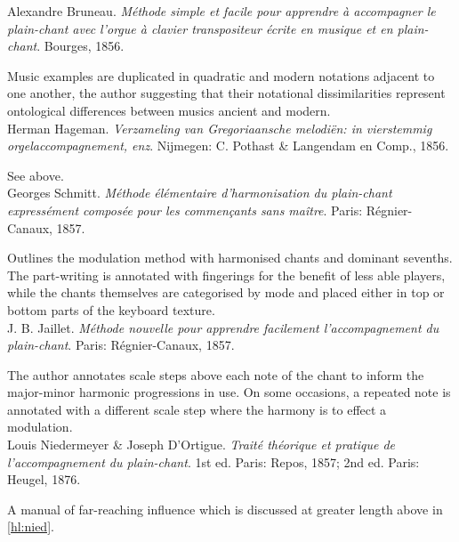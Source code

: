     \parindent=0pt
    \hangindent=0pt
  Alexandre Bruneau. \emph{Méthode simple et facile pour apprendre à accompagner le plain-chant  avec l'orgue à clavier transpositeur écrite en musique et en plain-chant}. Bourges, 1856.

     \parindent=20pt
     \hangindent=20pt
     Music examples are duplicated in quadratic and modern notations adjacent to one another, the author suggesting that their notational dissimilarities represent ontological differences between musics ancient and modern.\\

    \parindent=0pt
    \hangindent=0pt
  Herman Hageman. \emph{Verzameling van Gregoriaansche melodiën: in vierstemmig orgelaccompagnement, enz}. Nijmegen:  C. Pothast \& Langendam en Comp., 1856.

     \parindent=20pt
     \hangindent=20pt
     See  above.\\

    \parindent=0pt
    \hangindent=0pt
  Georges Schmitt. \emph{Méthode élémentaire d'harmonisation du plain-chant expressément composée pour les commençants sans maître}. Paris:  Régnier-Canaux, 1857.

     \parindent=20pt
     \hangindent=20pt
     Outlines the modulation method with harmonised chants and dominant sevenths. The part-writing is annotated with fingerings for the benefit of less able players, while the chants themselves are categorised by mode and placed either in top or bottom parts of the keyboard texture.\\

    \parindent=0pt
    \hangindent=0pt
  J. B. Jaillet. \emph{Méthode nouvelle pour apprendre facilement l'accompagnement du plain-chant}. Paris:  Régnier-Canaux, 1857.

     \parindent=20pt
     \hangindent=20pt
     The author annotates scale steps above each note of the chant to inform the major-minor harmonic progressions in use. On some occasions, a repeated note is annotated with a different scale step where the harmony is to effect a modulation.\\

    \parindent=0pt
    \hangindent=0pt
  Louis Niedermeyer \& Joseph D'Ortigue. \emph{Traité théorique et pratique de l'accompagnement du plain-chant}. 1st ed. Paris:  Repos, 1857;  2nd ed. Paris:  Heugel, 1876.

     \parindent=20pt
     \hangindent=20pt
     A manual of far-reaching influence which is discussed at greater length above in \cref{hl:nied}.\\


